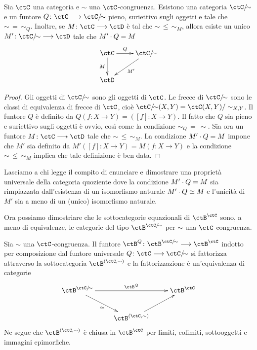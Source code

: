 \begin{proposition}\label{prop_cat_quoz}
 Sia \(\ctC\) una categoria e \(\sim\) una \(\ctC\)-congruenza. Esistono una categoria \(\ctC/{\!\sim}\) e un funtore
 \(Q \colon \ctC \fun \ctC/{\!\sim}\) pieno, suriettivo sugli oggetti e tale che \(\sim \,=\,\sim_Q\). Inoltre, se
 \(M \colon \ctC \fun \ctD\) è tal che \(\sim \,\leq\, \sim_M\), allora esiste un unico \(M' \colon \ctC/{\!\sim} \fun \ctD\)
 tale che \(M' \cdot Q = M\)
 \[\xymatrix{\ctC \ar[r]^-{Q} \ar[d]_-{M} & \ctC/{\!\sim} \ar[ld]^{M'} \\ \ctD }\]
\end{proposition}

\begin{proof}
 Gli oggetti di \(\ctC/{\!\sim}\) sono gli oggetti di \(\ctC\). Le frecce di  \(\ctC/{\!\sim}\) sono le classi di equivalenza di
 frecce di \(\ctC\), cioè  \(\ctC/{\!\sim}(X,Y) = \ctC(X,Y)/\sim_{X,Y}\). Il funtore \(Q\) è definito da
 \(Q(f \colon X \to Y) = (\left[f\right] \colon X \to Y)\). Il fatto che \(Q\) sia pieno e suriettivo sugli oggetti è ovvio, così
 come la condizione \(\sim_Q \,=\, \sim\). Sia ora un funtore \(M \colon \ctC \fun \ctD\)
 tale che \(\sim \,\leq\, \sim_M\). La condizione \(M' \cdot Q = M\) impone che \(M'\) sia definito da
 \(M'(\left[f\right] \colon X \to Y) = M(f \colon X \to Y)\) e la condizione \(\sim \,\leq\, \sim_M\) implica che tale definizione
 è ben data.
\end{proof}

\begin{exercise}\label{ex_cat_quoz_bidim}
 Lasciamo a chi legge il compito di enunciare e dimostrare una proprietà universale della categoria quoziente dove la
 condizione \(M' \cdot Q = M\) sia rimpiazzata dall'esistenza di un isomorfismo naturale \(M' \cdot Q \simeq M\) e
 l'unicità di \(M'\) sia a meno di un (unico) isomorfismo naturale.
\end{exercise}

Ora possiamo dimostriare che le sottocategorie equazionali di \(\ctB^\ctC\) sono, a meno di equivalenze, le categorie
del tipo \(\ctB^{\ctC/{\!\sim}}\) per \(\sim\) una \(\ctC\)-congruenza.

\begin{corollary}\label{cor_cat_equaz_quoz}
 Sia \(\sim\) una \(\ctC\)-congruenza. Il funtore \(\ctB^Q \colon \ctB^{\ctC/{\!\sim}} \fun \ctB^\ctC\) indotto per composizione dal funtore
 universale \(Q \colon \ctC \fun \ctC/{\!\sim}\) si fattorizza attraverso la sottocategoria \(\ctB^{(\ctC,\sim)}\) e la fattorizzazione è
 un'equivalenza di categorie
 \[\xymatrix{\ctB^{\ctC/{\!\sim}} \ar[rr]^-{\ctB^Q} \ar[rd]_{\simeq} & & \ctB^{\ctC} \\ & \ctB^{(\ctC,\sim)} \ar[ru] }\]
 Ne segue che \(\ctB^{(\ctC,\sim)}\) è chiusa in \(\ctB^\ctC\) per limiti, colimiti, sottooggetti e immagini epimorfiche.
\end{corollary}

